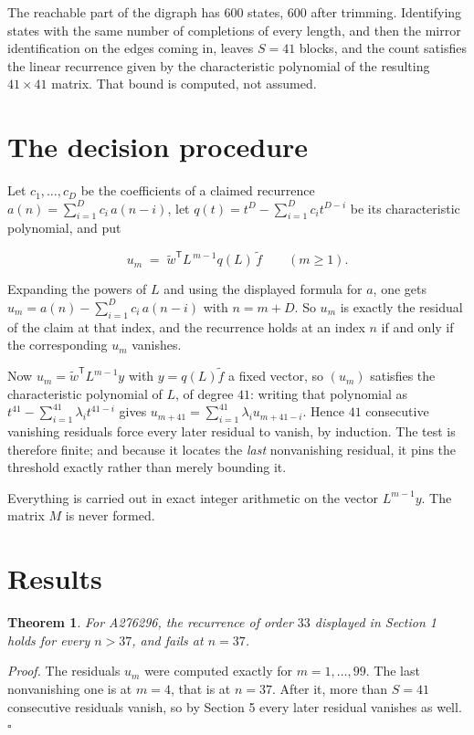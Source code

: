 \documentclass[11pt]{article}
\newtheorem{theorem}{Theorem}
\theoremstyle{definition}
\begin{document}
The reachable part of the digraph has $600$ states, $600$ after trimming. Identifying states with the same number of completions of every length, and then the mirror identification on the edges coming in, leaves $S = 41$ blocks, and the count satisfies the linear recurrence given by the characteristic polynomial of the resulting $41\times41$ matrix. That bound is computed, not assumed.

\section{The decision procedure}

Let $c_1,\dots,c_D$ be the coefficients of a claimed recurrence $a(n) = \sum_{i=1}^{D} c_i\,a(n-i)$, let $q(t) = t^{D} - \sum_{i=1}^{D} c_i t^{D-i}$ be its characteristic polynomial, and put

\[u_m \;=\; \tilde w^{\mathsf T} L^{\,m-1} q(L)\,\tilde f \qquad (m \ge 1).\]

Expanding the powers of $L$ and using the displayed formula for $a$, one gets $u_m = a(n) - \sum_{i=1}^{D} c_i\,a(n-i)$ with $n = m + D$. So $u_m$ is exactly the residual of the claim at that index, and the recurrence holds at an index $n$ if and only if the corresponding $u_m$ vanishes.

Now $u_m = \tilde w^{\mathsf T} L^{m-1} y$ with $y = q(L)\tilde f$ a fixed vector, so $(u_m)$ satisfies the characteristic polynomial of $L$, of degree $41$: writing that polynomial as $t^{41} - \sum_{i=1}^{41} \lambda_i t^{41-i}$ gives $u_{m+41} = \sum_{i=1}^{41} \lambda_i u_{m+41-i}$. Hence $41$ consecutive vanishing residuals force every later residual to vanish, by induction. The test is therefore finite; and because it locates the {\itshape last} nonvanishing residual, it pins the threshold exactly rather than merely bounding it.

Everything is carried out in exact integer arithmetic on the vector $L^{m-1}y$. The matrix $M$ is never formed.

\section{Results}

\begin{theorem} For A276296, the recurrence of order $33$ displayed in Section 1 holds for every $n > 37$, and fails at $n = 37$.\end{theorem}

{\itshape Proof.} The residuals $u_m$ were computed exactly for $m = 1,\dots,99$. The last nonvanishing one is at $m = 4$, that is at $n = 37$. After it, more than $S = 41$ consecutive residuals vanish, so by Section 5 every later residual vanishes as well. $\square$
\end{document}
